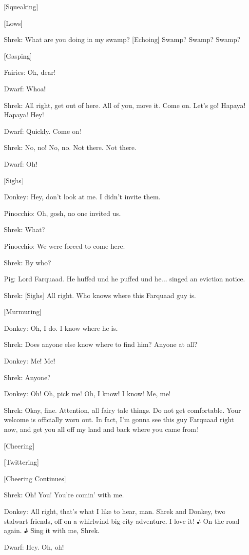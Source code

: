 \documentclass{article}
\begin{document}
[Squeaking]

[Lows]

Shrek:
What are you doing in my swamp? [Echoing] Swamp? Swamp? Swamp?

[Gasping]

Fairies:
Oh, dear!

Dwarf:
Whoa!

Shrek:
All right, get out of here. All of you, move it. Come on. Let's go! Hapaya! Hapaya! Hey!

Dwarf:
Quickly. Come on!

Shrek:
No, no! No, no. Not there. Not there.

Dwarf:
Oh!

[Sighs]

Donkey:
Hey, don’t look at me. I didn't invite them.

Pinocchio:
Oh, gosh, no one invited us.

Shrek:
What?

Pinocchio:
We were forced to come here.

Shrek:
By who?

Pig:
Lord Farquaad. He huffed und he puffed und he... singed an eviction notice.

Shrek:
[Sighs] All right. Who knows where this Farquaad guy is.

[Murmuring]

Donkey:
Oh, I do. I know where he is.

Shrek:
Does anyone else know where to find him? Anyone at all?

Donkey:
Me! Me!

Shrek:
Anyone?

Donkey:
Oh! Oh, pick me! Oh, I know! I know! Me, me!

Shrek:
Okay, fine. Attention, all fairy tale things. Do not get comfortable. Your welcome is officially worn out. In fact, I'm gonna see this guy Farquaad right now, and get you all off my land and back where you came from!

[Cheering]

[Twittering]

[Cheering Continues]

Shrek:
Oh! You! You're comin' with me.

Donkey:
All right, that's what I like to hear, man. Shrek and Donkey, two stalwart friends, off on a whirlwind big-city adventure. I love it! ♪ On the road again. ♪ Sing it with me, Shrek.

Dwarf:
Hey. Oh, oh!
\end{document}
